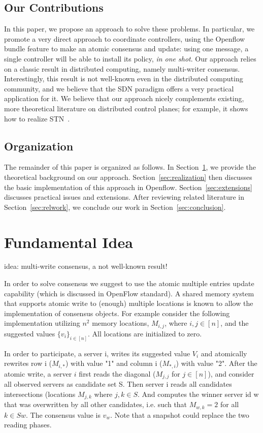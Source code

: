 \documentclass[conference]{sigcomm-alternate}
\begin{document}
\subsection{Our Contributions}

In this paper, we propose an approach to solve these problems.
In particular, we promote a very direct approach to coordinate controllers,
using the Openflow bundle feature to make an atomic consensus and update:
using one message, a single controller will be able to install its policy,
\emph{in one shot}. Our approach relies on a classic result in 
distributed computing, namely multi-writer consensus. Interestingly,
this result is not well-known even in the distributed computing community,
and we believe that the SDN paradigm offers a very practical
application for it. We believe that our approach nicely complements
existing, more theoretical literature on distributed control planes; for example,
it shows how to realize STN~\cite{stn}.

\subsection{Organization}

The remainder of this paper is organized as follows.
In Section~\ref{sec:background}, we provide the theoretical
background on our approach. Section~\ref{sec:realization}
then discusses the basic implementation of this approach in Openflow.
Section~\ref{sec:extensions} discusses practical issues and extensions.
After reviewing related literature in Section~\ref{sec:relwork},
we conclude our work in
Section~\ref{sec:conclusion}.


\section{Fundamental Idea}\label{sec:background}

idea: multi-write consensus, a not well-known result!

In order to solve consensus we suggest to use the atomic multiple entries update capability (which is discussed in OpenFlow standard). A shared memory system that supports atomic write to (enough) multiple locations is known to allow the implementation of consensus objects. For example consider the following implementation utilizing $n^2$ memory locations, $M_{i,j}$, where $i,j\in[n]$, and the suggested values $\{v_i\}_{i\in [n]}$. All locations are initialized to zero.

In order to participate, a server i, writes its suggested value $V_i$ and atomically rewrites row i ($M_{i,*}$) with value "1" and column i ($M_{*,i}$) with value "2". After the atomic write, a server $i$ first reads the diagonal ($M_{j,j}$ for $j\in [n]$), and consider all observed servers as candidate set S.  Then server i reads all candidates intersections (locations $M_{j,k}$ where $j,k\in S$. And computes the winner server id w that was overwritten by all other candidates, i.e. such that $M_{w,k}=2$ for all $k\in S {w}$. The consensus value is $v_w$.
Note that a snapshot could replace the two reading phases.
\end{document}
